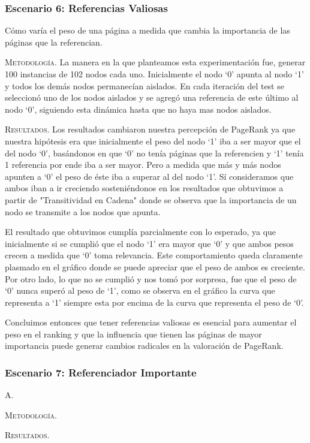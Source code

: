 \vspace{2em}
\subsubsection{Escenario 6: Referencias Valiosas} Cómo varía el peso de una página a medida que cambia la importancia de las páginas que la referencian.

\vspace{1em}
\noindent \textsc{Metodología}. La manera en la que planteamos esta experimentación fue, generar 100 instancias de 102 nodos cada uno. Inicialmente el nodo `0' apunta al nodo `1' y todos los demás nodos permanecían aislados. En cada iteración del test se seleccionó uno de los nodos aislados y se agregó una referencia de este último al nodo `0', siguiendo esta dinámica hasta que no haya mas nodos aislados.

\vspace{1em}
\noindent \textsc{Resultados}. Los resultados cambiaron nuestra percepción de PageRank ya que nuestra hipótesis era que inicialmente el peso del nodo `1' iba a ser mayor que el del nodo `0', basándonos en que `0' no tenía páginas que la referencien y `1' tenía 1 referencia por ende iba a ser mayor. Pero a medida que más y más nodos apunten a `0' el peso de éste iba a superar al del nodo `1'. Sí consideramos que ambos iban a ir creciendo sosteniéndonos en los resultados que obtuvimos a partir de "Transitividad en Cadena" donde se observa que la importancia de un nodo se transmite a los nodos que apunta.

\vspace{1em}
El resultado que obtuvimos cumplía parcialmente con lo esperado, ya que inicialmente si se cumplió que el nodo `1' era mayor que `0' y que ambos pesos crecen a medida que `0' toma relevancia. Este comportamiento queda claramente plasmado en el gráfico donde se puede apreciar que el peso de ambos es creciente. 
Por otro lado, lo que no se cumplió y nos tomó por sorpresa, fue que el peso de `0' nunca superó al peso de `1', como se observa en el gráfico la curva que representa a `1' siempre esta por encima de la curva que representa el peso de `0'.

\vspace{1em}
Concluimos entonces que tener referencias valiosas es esencial para aumentar el peso en el ranking y que la influencia que tienen las páginas de mayor importancia puede generar cambios radicales en la valoración de PageRank.



\vspace{2em}
\subsubsection{Escenario 7: Referenciador Importante} A.

\vspace{1em}
\noindent \textsc{Metodología}.  

\vspace{1em}
\noindent \textsc{Resultados}.